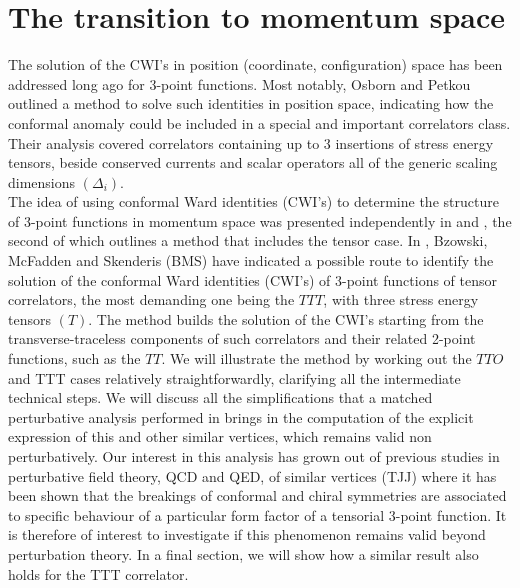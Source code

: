 \documentclass[a4paper,11pt,openright,twoside]{book}
\numberwithin{equation}{section}
\begin{document}
\section*{The transition to momentum space}

The solution of the CWI's in position (coordinate, configuration) space has been addressed long ago for 3-point functions\cite{Erdmenger:1996yc,Osborn:1993cr}. Most notably, Osborn and Petkou outlined a method to solve such identities in position space, indicating how the conformal anomaly could be included in a special and important correlators class. Their analysis covered correlators containing up to 3 insertions of stress energy tensors, beside conserved currents and scalar operators all of the generic scaling dimensions 
$(\Delta_i)$. \\
The idea of using conformal Ward identities (CWI's) to determine the structure of 3-point functions in momentum space was presented independently in \cite{Coriano:2013jba} and \cite{Bzowski:2013sza}, the second of which outlines a method that includes the tensor case. 
In \cite{Bzowski:2013sza}, Bzowski, McFadden and Skenderis (BMS)  have indicated a possible route to identify the solution of the conformal Ward identities (CWI's) of 3-point functions of tensor correlators, the most demanding one being the $TTT$, with three stress energy tensors $(T)$. The method builds the solution of the CWI's starting from the transverse-traceless components of such correlators and their related 2-point functions, such as the $TT$.
We will illustrate the method by working out the $TTO$ and TTT cases relatively straightforwardly, clarifying all the intermediate technical steps.  We will discuss all the simplifications that a matched perturbative analysis performed in \cite{Coriano:2018bsy,Coriano:2018bbe,Coriano:2018zdo} brings in the computation of the explicit expression of this and other similar vertices, which remains valid non perturbatively. Our interest in this analysis has grown out of previous studies in perturbative field theory, QCD and QED, of similar vertices (TJJ) \cite{Giannotti:2008cv,Armillis:2009pq,Armillis:2009im,Armillis:2010qk} where it has been shown that the breakings of conformal and chiral symmetries are associated to specific behaviour of a particular form factor of a tensorial 3-point function. It is therefore of interest to investigate if this phenomenon remains valid beyond perturbation theory. In a final section, we will show how a similar result also holds for the TTT correlator. \\
\end{document}
